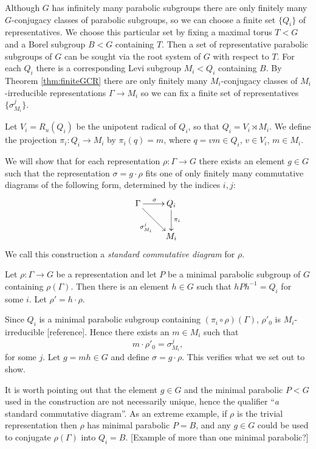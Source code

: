 Although $G$ has infinitely many parabolic subgroups there are only finitely many $G$-conjugacy classes of parabolic subgroups, so we can choose a finite set $\{Q_i\}$ of representatives. We choose this particular set by fixing a maximal torus $T<G$ and a Borel subgroup $B<G$ containing $T$. Then a set of representative parabolic subgroups of $G$ can be sought via the root system of $G$ with respect to $T$. For each $Q_i$ there is a corresponding Levi subgroup $M_i<Q_i$ containing $B$. By Theorem \ref{thm:finiteGCR} there are only finitely many $M_i$-conjugacy classes of $M_i$-irreducible representations $\Gamma \rightarrow M_i$ so we can fix a finite set of representatives $\{\sigma^j_{M_i}\}$. 

Let $V_i = R_u(Q_i)$ be the unipotent radical of $Q_i$, so that $Q_i = V_i \rtimes M_i$. We define the projection $\pi_i:Q_i \rightarrow M_i$ by $\pi_i(q) = m$, where $q = vm \in Q_i$, $v\in V_i$, $m\in M_i$.

We will show that for each representation $\rho:\Gamma\rightarrow G$ there exists an element $g\in G$ such that the representation $\sigma = g\cdot\rho$ fits one of only finitely many commutative diagrams of the following form, determined by the indices $i,j$:
\begin{displaymath}
	\xymatrix{
	\Gamma \ar[r]^{\sigma} \ar[rd]_{\sigma^j_{M_i}} & Q_i \ar[d]^{\pi_i}\\
	& M_i}
\end{displaymath}
We call this construction a \emph{standard commutative diagram} for $\rho$.

Let $\rho:\Gamma\rightarrow G$ be a representation and let $P$ be a minimal parabolic subgroup of $G$ containing $\rho(\Gamma)$. Then there is an element $h\in G$ such that $hPh^{-1} = Q_i$ for some $i$. Let $\rho' = h\cdot \rho$. 

Since $Q_i$ is a minimal parabolic subgroup containing $(\pi_i \circ \rho)(\Gamma)$, $\rho'_0$ is $M_i$-irreducible [reference]. Hence there exists an $m\in M_i$ such that
\begin{displaymath}
	m\cdot \rho'_0 = \sigma^j_{M_i}, 
\end{displaymath}
for some $j$. Let $g=mh\in G$ and define $\sigma = g\cdot \rho$. This verifies what we set out to show.

It is worth pointing out that the element $g\in G$ and the minimal parabolic $P<G$ used in the construction are not necessarily unique, hence the qualifier ``\emph{a} standard commutative diagram''. As an extreme example, if $\rho$ is the trivial representation then $\rho$ has minimal parabolic $P=B$, and any $g\in G$ could be used to conjugate $\rho(\Gamma)$ into $Q_i=B$. [Example of more than one minimal parabolic?]

